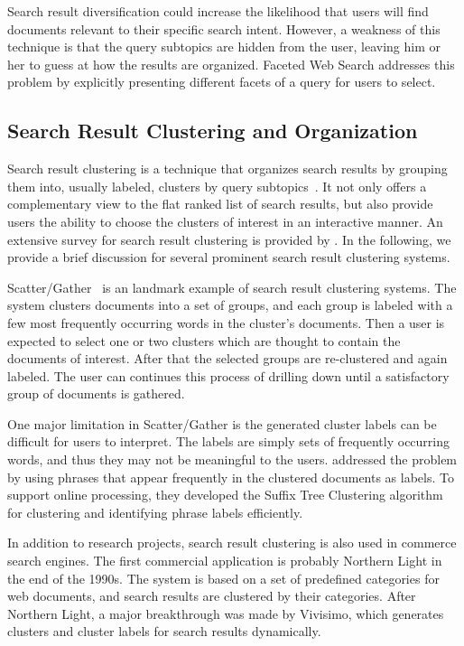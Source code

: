 Search result diversification could increase the likelihood that users will
find documents relevant to their specific search intent. However, a weakness of this technique is that the query subtopics are hidden from the user, leaving him or her to guess at how the results are organized. Faceted Web Search addresses this problem by explicitly presenting different facets of a query for users to select.

\subsection{Search Result Clustering and Organization}
Search result clustering is a technique that organizes search results by grouping them into, usually labeled, clusters by query subtopics~\cite{cutting1992scatter,kaki2005findex,zamir1999grouper,carpineto2009survey}. It not only offers a complementary view to the flat ranked list of search results, but also provide users the ability to choose the clusters of interest in an interactive manner. An extensive survey for search result clustering is provided by \citet{carpineto2009survey}. In the following, we provide a brief discussion for several prominent search result clustering systems.

Scatter/Gather~\cite{cutting1992scatter,hearst1996reexamining} is an landmark example of search result clustering systems. The system clusters documents into a set of groups, and each group is labeled with a few most frequently occurring words in the cluster's documents. Then a user is expected to select one or two clusters which are thought to contain the documents of interest. After that the selected groups are re-clustered and again labeled. The user can continues this process of drilling down until a satisfactory group of documents is gathered.

One major limitation in Scatter/Gather is the generated cluster labels can be difficult for users to interpret. The labels are simply sets of frequently occurring words, and thus they may not be meaningful to the users. \citet{zamir1999grouper,zamir1998web} addressed the problem by using phrases that appear frequently in the clustered documents as labels. To support online processing, they developed the Suffix Tree Clustering algorithm for clustering and identifying phrase labels efficiently.

In addition to research projects, search result clustering is also used in commerce search engines. The first commercial application is probably Northern Light in the end of the 1990s. The system is based on a set of predefined categories for web documents, and search results are clustered by their categories. After Northern Light, a major breakthrough was made by Vivisimo, which generates clusters and cluster labels for search results dynamically. 

